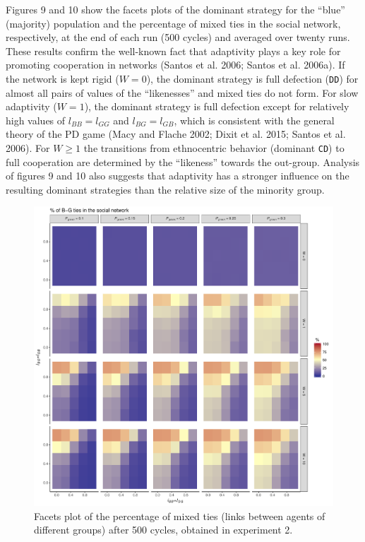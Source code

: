 Figures 9 and 10 show the facets plots of the dominant strategy for the ``blue'' (majority) population and the percentage of mixed ties in the social network, respectively, at the end of each run (500 cycles) and averaged over twenty runs. These results confirm the well-known fact that adaptivity plays a key role for promoting cooperation in networks (Santos et al. 2006; Santos et al. 2006a). If the network is kept rigid ($ W = 0 $), the dominant strategy is full defection (\texttt{DD}) for almost all pairs of values of the ``likenesses'' and mixed ties do not form. For slow adaptivity ($ W =1 $), the dominant strategy is full defection except for relatively high values of $ l_{BB} = l_{GG}$ and $ l_{BG} = l_{GB}$, which is consistent with the general theory of the PD game (Macy and Flache 2002; Dixit et al. 2015; Santos et al. 2006). For $ W \geq 1 $ the transitions from ethnocentric behavior (dominant \texttt{CD}) to full cooperation are determined by the ``likeness'' towards the out-group. Analysis of figures 9 and 10  also suggests that adaptivity has a stronger influence on the resulting dominant strategies than the relative size of the minority group.
\begin{figure}[t!]
	\label{fig:pctMixedTiesExperiment2}
	\begin{minipage}[c]{0.2\linewidth}
		\caption{Facets plot of the percentage of mixed ties (links between agents of different groups) after 500 cycles, obtained in experiment 2.}
	\end{minipage}
	\begin{minipage}[c]{0.75\linewidth}
		\includegraphics[trim={0cm 0cm 0.4cm 0cm}, clip, width=\linewidth]{figures/pctMixedTiesExperiment2.pdf}
	\end{minipage}
\end{figure}

